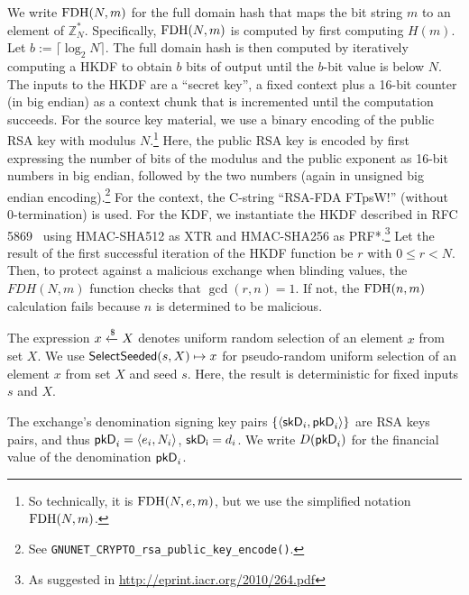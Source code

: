 We write $\textrm{FDH}(N,m)$ for the full domain hash that maps the bit string $m$ to
an element of $\mathbb{Z}^*_N$.  Specifically, $\textrm{FDH}(N,m)$ is computed by
first computing $H(m)$. Let $b := \lceil \log_2 N\rceil$.  The full domain
hash is then computed by iteratively computing a HKDF to obtain $b$ bits of
output until the $b$-bit value is below $N$.  The inputs to the HKDF are a
``secret key'', a fixed context plus a 16-bit counter (in big endian) as a
context chunk that is incremented until the computation succeeds.  For the
source key material, we use a binary encoding of the public RSA key with
modulus $N$.\footnote{So technically, it is $\textrm{FDH}(N,e,m)$, but we use the
  simplified notation $\textrm{FDH}(N,m)$.}  Here, the public RSA key is encoded by
first expressing the number of bits of the modulus and the public exponent as
16-bit numbers in big endian, followed by the two numbers (again in unsigned
big endian encoding).\footnote{See
  \texttt{GNUNET\_CRYPTO\_rsa\_public\_key\_encode()}.}  For the context, the
C-string ``RSA-FDA FTpsW!'' (without 0-termination) is used.  For the KDF, we
instantiate the HKDF described in RFC 5869~\cite{rfc5869} using HMAC-SHA512 as
XTR and HMAC-SHA256 as PRF*.\footnote{As suggested in
  \url{http://eprint.iacr.org/2010/264.pdf}} Let the result of the first
successful iteration of the HKDF function be $r$ with $0 \le r < N$.  Then, to
protect against a malicious exchange when blinding values, the $FDH(N,m)$
function checks that $\gcd(r,n) = 1$. If not, the $\textrm{FDH}(n,m)$ calculation
fails because $n$ is determined to be malicious.

The expression $x \xleftarrow{\text{\$}} X$ denotes uniform random selection of an element
$x$ from set $X$.  We use $\mathsf{SelectSeeded}(s, X) \mapsto x$ for pseudo-random uniform
selection of an element $x$ from set $X$ and seed $s$.  Here, the result is deterministic for fixed inputs $s$ and $X$.

The exchange's denomination signing key pairs $\{\langle \mathsf{skD}_i, \mathsf{pkD}_i \rangle \}$ are RSA keys pairs,
and thus $\mathsf{pkD}_i = \langle e_i, N_i \rangle$, $\mathsf{skD_i} = d_i$.  We write $D(\mathsf{pkD}_i)$ for the
financial value of the denomination $\mathsf{pkD}_i$.




